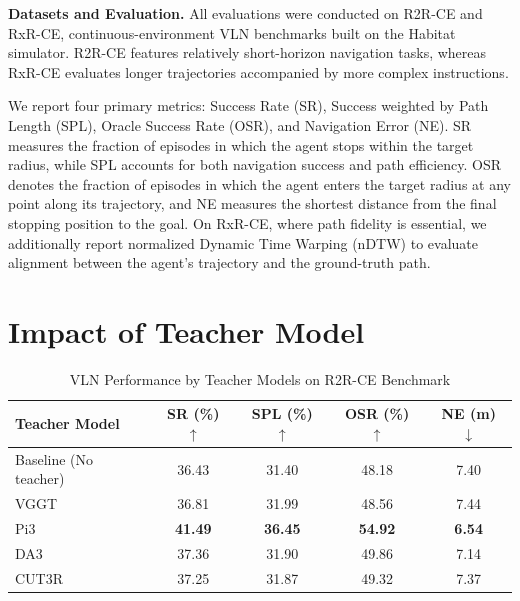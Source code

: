 \textbf{Datasets and Evaluation.} All evaluations were conducted on R2R-CE and RxR-CE, continuous-environment VLN benchmarks built on the Habitat simulator. R2R-CE features relatively short-horizon navigation tasks, whereas RxR-CE evaluates longer trajectories accompanied by more complex instructions.

We report four primary metrics: Success Rate (SR), Success weighted by Path Length (SPL), Oracle Success Rate (OSR), and Navigation Error (NE). SR measures the fraction of episodes in which the agent stops within the target radius, while SPL accounts for both navigation success and path efficiency. OSR denotes the fraction of episodes in which the agent enters the target radius at any point along its trajectory, and NE measures the shortest distance from the final stopping position to the goal. On RxR-CE, where path fidelity is essential, we additionally report normalized Dynamic Time Warping (nDTW) to evaluate alignment between the agent's trajectory and the ground-truth path.

\section{Impact of Teacher Model}
\label{sec:exp_teacher}

\begin{table}[t]
    \centering
    \caption{VLN Performance by Teacher Models on R2R-CE Benchmark}
    \label{tab:r2r_teachers}
    \begin{tabular}{lcccc}
        \toprule
        Teacher Model & SR (\%) $\uparrow$ & SPL (\%) $\uparrow$ & OSR (\%) $\uparrow$ & NE (m) $\downarrow$ \\
        \midrule
        Baseline (No teacher) & 36.43 & 31.40 & 48.18 & 7.40 \\
        VGGT & 36.81 & 31.99 & 48.56 & 7.44 \\
        Pi3 & \textbf{41.49} & \textbf{36.45} & \textbf{54.92} & \textbf{6.54} \\
        DA3 & 37.36 & 31.90 & 49.86 & 7.14 \\
        CUT3R & 37.25 & 31.87 & 49.32 & 7.37 \\
        \bottomrule
    \end{tabular}
\end{table}

